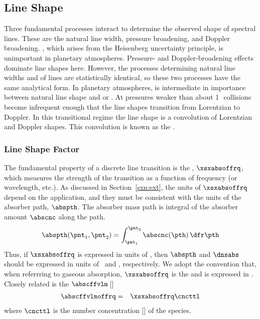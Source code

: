 \documentclass[12pt]{article}
\begin{document}
\subsection{Line Shape}\label{sxn:lnshp}
Three fundamental processes interact to determine the observed shape
of spectral lines.
These are the natural line width, pressure broadening, and Doppler
broadening. 
, which arises from the Heisenberg
uncertainty principle, is unimportant in planetary atmospheres.
Pressure- and Doppler-broadening effects dominate line shapes here.
However, the processes determining natural line widths and
 of lines are statistically identical, so 
these two processes have the same analytical form.
In planetary atmospheres,  is intermediate
in importance between natural line shape and  or .
At pressures weaker than about 1\,\mb\ collisions become infrequent
enough that the line shapes transition from Lorentzian to Doppler. 
In this transitional regime the line shape is a convolution of
Lorentzian and Doppler shapes.
This convolution is known as the .

\subsubsection[Line Shape Factor]{Line Shape Factor}\label{sxn:lnshp_fct}
The fundamental property of a discrete line transition is the
, $\xsxabsoffrq$, which
measures the strength of the transition as a function of frequency (or 
wavelength, etc.).
As discussed in Section~\ref{sxn:ext}, the units of $\xsxabsoffrq$
depend on the application, and they must be consistent with the units
of the absorber path, $\abspth$.  
The absorber mass path is integral of the absorber amount
$\abscnc$ along the path. 
\begin{equation}
\abspth(\pnt_{1},\pnt_{2}) = \int_{\pnt_{1}}^{\pnt_{2}} \abscnc(\pth) \,\dfr\pth
\label{eqn:abs_pth_dfn}
\end{equation}
Thus, if $\xsxabsoffrq$ is expressed in units of \mSxkg, then
$\abspth$ and $\dnsabs$ should be expressed in units of \kgxmS\ and
\kgxmC, respectively.
We adopt the convention that, when referrring to gaseous absorption,
$\xsxabsoffrq$ is the  and is
expressed in \mSxmlc. 
Closely related is the 
$\abscffvlm$\,[\xm]
\begin{eqnarray}
\abscffvlmoffrq & = & \xsxabsoffrq \cncttl
\label{eqn:abs_cff_nbr_dfn}
\end{eqnarray}
where $\cncttl$ is the number concentration [\mlcxmC] of the species.
\end{document}
